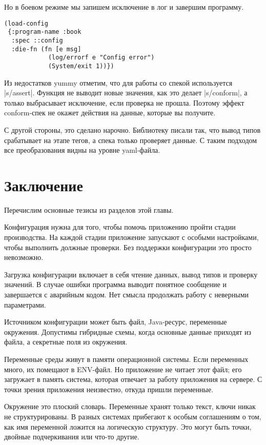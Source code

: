 Но в боевом режиме мы запишем исключение в лог и завершим программу.

\begin{verbatim}
(load-config
 {:program-name :book
  :spec ::config
  :die-fn (fn [e msg]
            (log/errorf e "Config error")
            (System/exit 1))})
\end{verbatim}

Из недостатков yummy отметим, что для работы со спекой используется
\spverb|s/assert|. Функция не выводит новые значения, как это делает
\spverb|s/conform|, а только выбрасывает исключение, если проверка не
прошла. Поэтому эффект conform-спек не окажет действия на данные, которые вы
получите.

С другой стороны, это сделано нарочно. Библиотеку писали так, что вывод типов
срабатывает на этапе тегов, а спека только проверяет данные. С таким подходом
все преобразования видны на уровне yaml-файла.

\section{Заключение}

Перечислим основные тезисы из разделов этой главы.

Конфигурация нужна для того, чтобы помочь приложению пройти стадии
производства. На каждой стадии приложение запускают с особыми настройками, чтобы
выполнить должные проверки. Без поддержки конфигурации это просто невозможно.

Загрузка конфигурации включает в себя чтение данных, вывод типов и проверку
значений. В случае ошибки программа выводит понятное сообщение и завершается с
аварийным кодом. Нет смысла продолжать работу с неверными параметрами.

Источником конфигурации может быть файл, Java-ресурс, переменные
окружения. Допустимы гибридные схемы, когда основные данные приходят из файла, а
секретные поля из окружения.

Переменные среды живут в памяти операционной системы. Если переменных много, их
помещают в ENV-файл. Но приложение не читает этот файл; его загружает в память
система, которая отвечает за работу приложения на сервере. С точки зрения
приложения неизвестно, откуда пришли переменные.

Окружение это плоский словарь. Переменные хранят только текст, ключи никак не
структурированы. В разных системах прибегают к особым соглашениям о том, как имя
переменной ложится на логическую структуру. Это могут быть точки, двойные
подчеркивания или что-то другие.

